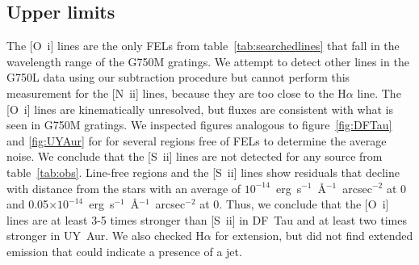 \documentclass[twocolumn]{aastex62}
\begin{document}
\subsection{Upper limits}
The [O~{\sc i}] lines are the only FELs from table~\ref{tab:searchedlines} that fall in the wavelength range of the G750M gratings. We attempt to detect other lines in the G750L data using our subtraction procedure but cannot perform this measurement for the [N~{\sc ii}] lines, because they are too close to the H$\alpha$ line. The [O~{\sc i}] lines are kinematically unresolved, but fluxes are consistent with what is seen in G750M gratings. We inspected figures analogous to figure~\ref{fig:DFTau} and \ref{fig:UYAur} for for several regions free of FELs to determine the average noise. We conclude that the [S~{\sc ii}] lines are not detected for any source from table~\ref{tab:obs}. Line-free regions and the [S~{\sc ii}] lines show residuals that decline with distance from the stars with an average of $10^{-14}$~erg~s$^{-1}$~\AA{}$^{-1}$~arcsec$^{-2}$ at 0 and 0.05$\times10^{-14}$~erg~s$^{-1}$~\AA{}$^{-1}$~arcsec$^{-2}$ at 0. Thus, we conclude that the [O~{\sc i}] lines are at least 3-5 times stronger than [S~{\sc ii}] in DF~Tau and at least two times stronger in UY~Aur. We also checked H$\alpha$ for extension, but did not find extended emission that could indicate a presence of a jet. 
\end{document}
